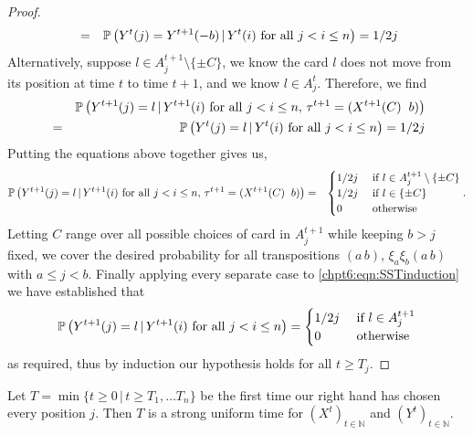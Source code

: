 \documentclass[11pt]{report}
\begin{document}
\begin{proof}
\begin{eqnarray}
	& = & \mathbb{P}\left(Y^{t}(j) = Y^{t+1}(-b) \, | \, Y^{t}(i) \textnormal{ for all } j < i \leq n  \right) = 1/2j \label{chpt5:eqn:SSThardind1.5}
	\end{eqnarray}
	Alternatively, suppose $l \in A_{j}^{t+1} \setminus \{\pm C\}$, we know the card $l$ does not move from its position at time $t$ to time $t+1$, and we know $l \in A_{j}^{t}$. Therefore, we find
	\begin{eqnarray}
	& & \mathbb{P}\left(Y^{t+1}(j) = l \, | \, Y^{t+1}(i) \textnormal{ for all } j < i \leq n , \, \tau^{t+1} = (X^{t+1}(C) \hspace{0.2cm} b)\right) \nonumber \\
	& = & \mathbb{P}\left(Y^{t}(j) = l \, | \, Y^{t}(i) \textnormal{ for all } j < i \leq n  \right) = 1/2j \label{chpt5:eqn:SSThardind2}
	\end{eqnarray}
	Putting the equations above together gives us,
	\begin{eqnarray*}
		\mathbb{P}\left(Y^{t+1}(j) = l \, | \,  Y^{t+1}(i) \textnormal{ for all } j < i \leq n, \, \tau^{t+1} = (X^{t+1}(C) \hspace{0.2cm} b)\right) & = & 
		\begin{cases}
			1/2j & \textnormal{ if }  l \in A_{j}^{t+1} \setminus\{ \pm C \}\\
			1/2j & \textnormal{ if }  l \in \{ \pm C\} \\
			0 & \textnormal{ otherwise }
		\end{cases}.
	\end{eqnarray*}
	Letting $C$ range over all possible choices of card in $A_{j}^{t+1}$ while keeping $b> j$ fixed, we cover the desired probability for all transpositions $(a\, b)$, $\xi_{a}\xi_{b}(a\, b)$ with $a\leq j < b$. 
	Finally applying every separate case to \eqref{chpt6:eqn:SSTinduction} we have established that 
	\[\mathbb{P}\left(Y^{t+1}(j) = l \, | \, Y^{t+1}(i) \textnormal{ for all } j < i \leq n
	\right) = \begin{cases}
	1/2j & \textnormal{ if } l \in A_{j}^{t+1}\\
	0 & \textnormal{ otherwise } 
	\end{cases} \]
	as required, thus by induction our hypothesis holds for all 
	$t \geq T_{j}$.
	
\end{proof}

\begin{lemma}
	\label{chpt6:lem:SUTresutl}
	Let $T =\min\{t \geq 0  \, | \, t \geq T_{1},\ldots T_{n}\}$ be the first time our right hand has chosen every position $j$. Then $T$ is a strong uniform time for $(X^{t})_{t \in \mathbb{N}}$ and $(Y^{t})_{t \in \mathbb{N}}$.
\end{lemma}
\end{document}

